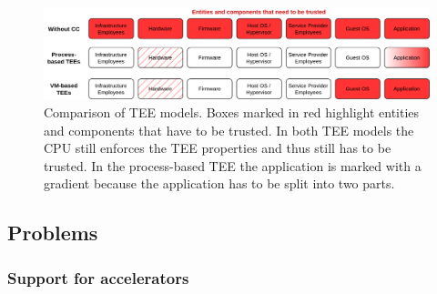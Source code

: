 \begin{figure}
  \centering
  \includegraphics[width=\linewidth]{resources/cc-tee-comparison.png}
  \caption[Comparison of trusted execution environment models]{
    Comparison of TEE models. Boxes marked in red highlight entities and
    components that have to be trusted. In both TEE models the CPU still
    enforces the TEE properties and thus still has to be trusted. In the
    process-based TEE the application is marked with a gradient because the
    application has to be split into two parts.
  }
  \label{figure:cc-tee-comparison}
\end{figure}

\subsection{Problems}

\subsubsection{Support for accelerators}

